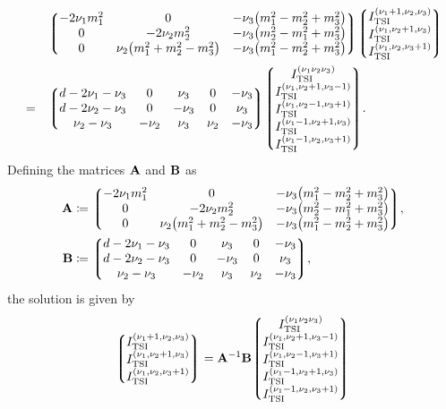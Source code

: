 \documentclass{article}
\begin{document}
        \begin{equation}
            \begin{aligned}
                & & & \mqty*(
                    -2 \nu_1 m_1^2 & 0 & -\nu_3 \qty(m_1^2 - m_2^2 + m_3^2) \\
                    0 & -2 \nu_2 m_2^2 & -\nu_3 \qty(m_2^2 - m_1^2 + m_3^2) \\
                    0 & \nu_2 \qty(m_1^2 + m_2^2 - m_3^2) & -\nu_3 \qty(m_1^2 - m_2^2 + m_3^2)
                ) \mqty*(\TSI{\nu_1 + 1, \nu_2, \nu_3} \\ \TSI{\nu_1, \nu_2 + 1, \nu_3} \\ \TSI{\nu_1, \nu_2, \nu_3 + 1}) \\
                & = & & \mqty*(
                    d - 2 \nu_1 - \nu_3 & 0 & \nu_3 & 0 & -\nu_3 \\
                    d - 2 \nu_2 - \nu_3 & 0 & -\nu_3 & 0 & \nu_3 \\
                    \nu_2 - \nu_3 & -\nu_2 & \nu_3 & \nu_2 & -\nu_3
                ) \mqty*(
                    \TSI{\nu_1 \nu_2 \nu_3} \\
                    \TSI{\nu_1, \nu_2 + 1, \nu_3 - 1} \\ \TSI{\nu_1, \nu_2 - 1, \nu_3 + 1} \\
                    \TSI{\nu_1 - 1, \nu_2 + 1, \nu_3} \\ \TSI{\nu_1 - 1, \nu_2, \nu_3 + 1}
                ).
            \end{aligned}
        \end{equation}
        Defining the matrices $\vb{A}$ and $\vb{B}$ as
        \begin{align}
            \vb{A} & \coloneq \mqty*(
                -2 \nu_1 m_1^2 & 0 & -\nu_3 \qty(m_1^2 - m_2^2 + m_3^2) \\
                0 & -2 \nu_2 m_2^2 & -\nu_3 \qty(m_2^2 - m_1^2 + m_3^2) \\
                0 & \nu_2 \qty(m_1^2 + m_2^2 - m_3^2) & -\nu_3 \qty(m_1^2 - m_2^2 + m_3^2)
            ), \\
            \vb{B} & \coloneq \mqty*(
                d - 2 \nu_1 - \nu_3 & 0 & \nu_3 & 0 & -\nu_3 \\
                d - 2 \nu_2 - \nu_3 & 0 & -\nu_3 & 0 & \nu_3 \\
                \nu_2 - \nu_3 & -\nu_2 & \nu_3 & \nu_2 & -\nu_3
            ),
        \end{align}
        the solution is given by
        \begin{equation}
            \mqty*(\TSI{\nu_1 + 1, \nu_2, \nu_3} \\ \TSI{\nu_1, \nu_2 + 1, \nu_3} \\ \TSI{\nu_1, \nu_2, \nu_3 + 1}) = \vb{A}^{-1} \vb{B} \mqty*(
                \TSI{\nu_1 \nu_2 \nu_3} \\
                \TSI{\nu_1, \nu_2 + 1, \nu_3 - 1} \\ \TSI{\nu_1, \nu_2 - 1, \nu_3 + 1} \\
                \TSI{\nu_1 - 1, \nu_2 + 1, \nu_3} \\ \TSI{\nu_1 - 1, \nu_2, \nu_3 + 1}
            )
            \label{eq:IBP-solution}
        \end{equation}
\end{document}
